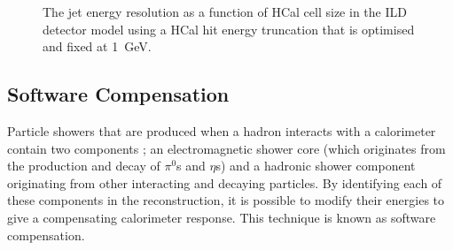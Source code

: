 \begin{figure}[h!]
\caption[The jet energy resolution as a function of HCal cell size in the ILD detector model using a HCal hit energy truncation that is \protect{} optimised and \protect{} fixed at 1~GeV.]{The jet energy resolution as a function of HCal cell size in the ILD detector model using a HCal hit energy truncation that is \protect{} optimised and \protect{} fixed at 1~GeV.}
\label{fig:jerhcalcellopt}
\end{figure}


\subsection{Software Compensation}
\label{sec:softcomp}
Particle showers that are produced when a hadron interacts with a calorimeter contain two components \cite{Wigmans:2000vf}; an electromagnetic shower core (which originates from the production and decay of $\pi^{0}$s and $\eta$s) and a hadronic shower component originating from other interacting and decaying particles.  By identifying each of these components in the reconstruction, it is possible to modify their energies to give a compensating calorimeter response.  This technique is known as software compensation.  

